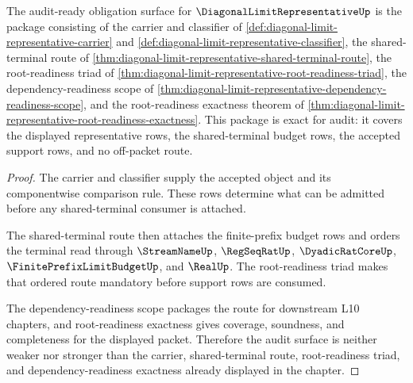 \begin{theorem}
\label{thm:diagonal-limit-representative-audit-readiness-package}
The audit-ready obligation surface for $\DiagonalLimitRepresentativeUp$ is the package consisting of the carrier and classifier of \autoref{def:diagonal-limit-representative-carrier} and \autoref{def:diagonal-limit-representative-classifier}, the shared-terminal route of \autoref{thm:diagonal-limit-representative-shared-terminal-route}, the root-readiness triad of \autoref{thm:diagonal-limit-representative-root-readiness-triad}, the dependency-readiness scope of \autoref{thm:diagonal-limit-representative-dependency-readiness-scope}, and the root-readiness exactness theorem of \autoref{thm:diagonal-limit-representative-root-readiness-exactness}. This package is exact for audit: it covers the displayed representative rows, the shared-terminal budget rows, the accepted support rows, and no off-packet route.
\end{theorem}
\begin{proof}
The carrier and classifier supply the accepted object and its componentwise comparison rule. These rows determine what can be admitted before any shared-terminal consumer is attached.

The shared-terminal route then attaches the finite-prefix budget rows and orders the terminal read through $\StreamNameUp$, $\RegSeqRatUp$, $\DyadicRatCoreUp$, $\FinitePrefixLimitBudgetUp$, and $\RealUp$. The root-readiness triad makes that ordered route mandatory before support rows are consumed.

The dependency-readiness scope packages the route for downstream L10 chapters, and root-readiness exactness gives coverage, soundness, and completeness for the displayed packet. Therefore the audit surface is neither weaker nor stronger than the carrier, shared-terminal route, root-readiness triad, and dependency-readiness exactness already displayed in the chapter.
\end{proof}

